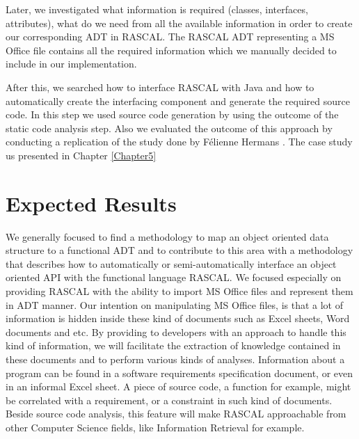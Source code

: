 Later, we investigated what information is required (classes, interfaces, attributes), what do we need from all the available information in order to create our corresponding ADT in RASCAL. The RASCAL ADT representing a MS Office file contains all the required information which we manually decided to include in our implementation.

After this, we searched how to interface RASCAL with Java and how to automatically create the interfacing component and generate the required source code. In this step we used source code generation by using the outcome of the static code analysis step. Also we evaluated the outcome of this approach by conducting a replication of the study done by F\'{e}lienne Hermans \cite{Feliene1}. The case study us presented in Chapter \ref{Chapter5} 

\section{Expected Results}
We generally focused to find a methodology to map an object oriented data structure to a functional ADT and to contribute to this area with a methodology that describes how to automatically or semi-automatically interface an object oriented API  with the functional language RASCAL.
We focused especially on providing RASCAL with the ability to import MS Office files and represent them in ADT manner. Our intention on manipulating MS Office files, is that a lot of information is hidden inside these kind of documents such as Excel sheets, Word documents \cite{signifWord} and etc. By providing to developers with an approach to handle this kind of information, we will facilitate the extraction of knowledge contained in these documents and to perform various kinds of analyses. Information about a program can be found in a software requirements specification document, or even in an informal Excel sheet. A piece of source code, a function for example, might be correlated with a requirement, or a constraint in such kind of documents. Beside source code analysis, this feature will make RASCAL approachable from other Computer Science fields, like Information Retrieval for example.







